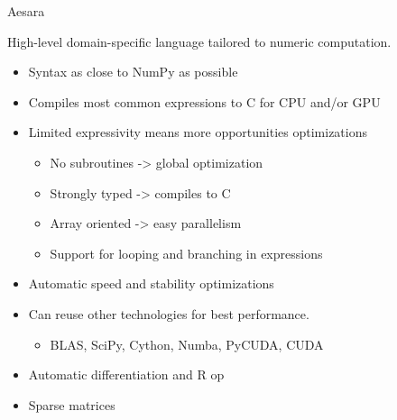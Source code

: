 \documentclass[utf8x,xcolor=pdftex,dvipsnames,table]{beamer}
\begin{document}






\begin{frame}{Aesara}

  High-level domain-specific language tailored to numeric computation.

  \begin{itemize}
    \item Syntax as close to NumPy as possible
    \item Compiles most common expressions to C for CPU and/or GPU
    \item Limited expressivity means more opportunities optimizations
    \begin{itemize}
      \item No subroutines -> global optimization
      \item Strongly typed -> compiles to C
      \item Array oriented -> easy parallelism
      \item Support for looping and branching in expressions
    \end{itemize}
    \item Automatic speed and stability optimizations
    \item Can reuse other technologies for best performance.
    \begin{itemize}
      \item BLAS, SciPy, Cython, Numba, PyCUDA, CUDA
    \end{itemize}
    \item Automatic differentiation and R op
    \item Sparse matrices
  \end{itemize}
\end{frame}
\end{document}
